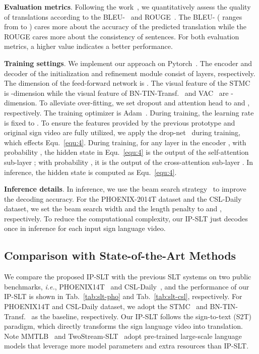 \documentclass[10pt,twocolumn,letterpaper]{article}
\begin{document}
    \smallskip
    \noindent \textbf{Evaluation metrics}.
    Following the work~\cite{zhou2021improving}, we quantitatively assess the quality of translations according to the BLEU-~\cite{papineni2002bleu} and ROUGE~\cite{rouge2004package}.
    The BLEU- ( ranges from  to ) cares more about the accuracy of the predicted translation while the ROUGE cares more about the consistency of sentences. 
    For both evaluation metrics, a higher value indicates a better performance.
    
    \smallskip
    \noindent \textbf{Training settings}.
    We implement our approach on Pytorch~\cite{paszke2017automatic}. 
    The encoder and decoder of the initialization and refinement module consist of  layers, respectively.
    The dimension of the feed-forward network is . 
    The visual feature of the STMC~\cite{zhou2021spatial} is -dimension while the visual feature of BN-TIN-Transf.~\cite{zhou2021improving} and VAC~\cite{min2021visual} are -dimension.
    To alleviate over-fitting, we set dropout and attention head to  and , respectively. 
    The training optimizer is Adam~\cite{kingma2014adam}.
    During training, the learning rate is fixed to . 
    To ensure the features provided by the previous prototype and original sign video are fully utilized, we apply the drop-net~\cite{zhu2020incorporating} during training, which effects Equ.~\eqref{equ:4}.
    During training, for any layer in the encoder , with probability , the hidden state  in Equ.~\eqref{equ:4} is the output of the self-attention sub-layer ; with probability , it is the output of the cross-attention sub-layer . 
    In inference, the hidden state  is computed as Equ.~\eqref{equ:4}.

    \smallskip
    \noindent \textbf{Inference details}.
    In inference, we use the beam search strategy~\cite{wu2016google} to improve the decoding accuracy. 
    For the PHOENIX-2014T dataset and the CSL-Daily dataset, we set the beam search width and the length penalty to  and , respectively.
    To reduce the computational complexity, our IP-SLT just decodes once in inference for each input sign language video.


    \subsection{Comparison with State-of-the-Art Methods}
    We compare the proposed IP-SLT with the previous SLT systems on two public benchmarks, \emph{i.e.}, PHOENIX14T~\cite{camgoz2018neural} and CSL-Daily~\cite{zhou2021improving}, and the performance of our IP-SLT is shown in Tab.~\ref{tab:slt-pho} and Tab.~\ref{tab:slt-csl}, respectively. 
    For PHOENIX14T and CSL-Daily dataset, we adopt the STMC~\cite{zhou2021spatial} and BN-TIN-Transf.~\cite{zhou2021improving} as the baseline, respectively.
    Our IP-SLT follows the sign-to-text (S2T) paradigm, which directly transforms the sign language video into translation.
    Note MMTLB~\cite{chen2022simple} and TwoStream-SLT~\cite{chen2022two} adopt pre-trained large-scale language models that leverage more model parameters and extra resources than IP-SLT.
\end{document}
